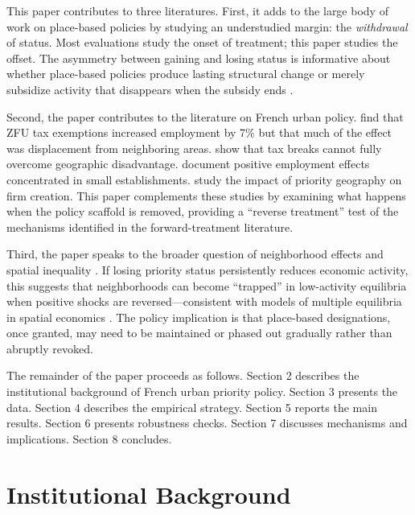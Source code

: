 \documentclass[12pt]{article}
\begin{document}
This paper contributes to three literatures. First, it adds to the large body of work on place-based policies \citep{bartik2020using, slattery2020evaluating, kline2013place} by studying an understudied margin: the \textit{withdrawal} of status. Most evaluations study the onset of treatment; this paper studies the offset. The asymmetry between gaining and losing status is informative about whether place-based policies produce lasting structural change or merely subsidize activity that disappears when the subsidy ends \citep{greenstone2010identifying}.

Second, the paper contributes to the literature on French urban policy. \citet{mayer2017effects} find that ZFU tax exemptions increased employment by 7\% but that much of the effect was displacement from neighboring areas. \citet{briant2015railroad} show that tax breaks cannot fully overcome geographic disadvantage. \citet{givord2013zones} document positive employment effects concentrated in small establishments. \citet{garnierfranklin2023zone} study the impact of priority geography on firm creation. This paper complements these studies by examining what happens when the policy scaffold is removed, providing a ``reverse treatment'' test of the mechanisms identified in the forward-treatment literature.

Third, the paper speaks to the broader question of neighborhood effects and spatial inequality \citep{chetty2014where, benabou1993workings}. If losing priority status persistently reduces economic activity, this suggests that neighborhoods can become ``trapped'' in low-activity equilibria when positive shocks are reversed---consistent with models of multiple equilibria in spatial economics \citep{kline2013place, duranton2004micro}. The policy implication is that place-based designations, once granted, may need to be maintained or phased out gradually rather than abruptly revoked.

The remainder of the paper proceeds as follows. Section 2 describes the institutional background of French urban priority policy. Section 3 presents the data. Section 4 describes the empirical strategy. Section 5 reports the main results. Section 6 presents robustness checks. Section 7 discusses mechanisms and implications. Section 8 concludes.


\section{Institutional Background}
\end{document}
